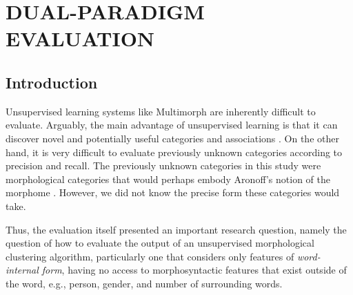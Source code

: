 \chapter{DUAL-PARADIGM EVALUATION}
\label{ch:eval}

\section{Introduction}

Unsupervised learning systems like Multimorph are inherently difficult to evaluate. 
Arguably, the main advantage of unsupervised learning is that it can discover novel and potentially useful categories and associations \citep{parsons:2004}. 
On the other hand, it is very difficult to evaluate previously unknown 
categories according to precision and recall. %
The previously unknown categories in this study were morphological 
categories that would perhaps embody Aronoff's notion of the morphome \citep{aronoff:1994}.  
However, we did not know the precise form these categories would take. 



Thus, the evaluation itself presented an important research question, namely the question 
of how to evaluate the output of an unsupervised morphological clustering algorithm, 
particularly one that considers only features of \emph{word-internal form}, having no 
access to morphosyntactic features that exist outside of the word, e.g., person, gender, and 
number of surrounding words.

